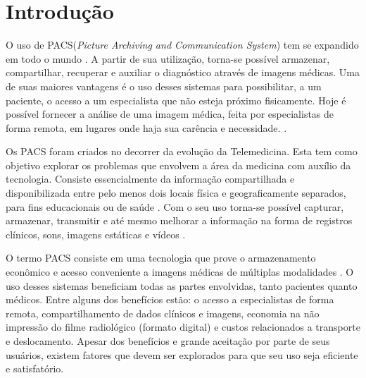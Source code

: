 \section{\esp Introdução}


O uso de PACS(\textit{Picture Archiving and Communication System}) tem se expandido em todo o mundo \cite{REF08}. A partir de sua utilização, torna-se possível armazenar, compartilhar, recuperar e auxiliar o diagnóstico através de imagens médicas. 
Uma de suas maiores vantagens é o uso desses sistemas para possibilitar, a um paciente, o acesso a um especialista que não esteja próximo fisicamente. 
Hoje é possível fornecer a análise de uma imagem médica, feita por especialistas de forma remota, em lugares onde haja sua carência e necessidade. \cite{REF01} \cite{REF04}.

Os PACS foram criados no decorrer da evolução da Telemedicina. 
Esta tem como objetivo explorar os problemas que envolvem a área da medicina com auxílio da tecnologia.
Consiste essencialmente da informação compartilhada e disponibilizada entre pelo menos dois locais física e geograficamente separados, para fins educacionais ou de saúde \cite{REF01}. 
Com o seu uso torna-se possível capturar, armazenar, transmitir e até mesmo melhorar a informação na forma de registros clínicos, sons, imagens estáticas e vídeos \cite{REF12}.

O termo PACS consiste em uma tecnologia que prove o armazenamento econômico e acesso conveniente a imagens médicas de múltiplas modalidades \cite{REF11}. O uso desses sistemas beneficiam todas as partes envolvidas, tanto pacientes quanto médicos.
Entre alguns dos benefícios estão: o acesso a especialistas de forma remota, compartilhamento de dados clínicos e imagens, economia na não impressão do filme radiológico (formato digital) e custos relacionados a transporte e deslocamento.
Apesar dos benefícios e grande aceitação por parte de seus usuários, existem fatores que devem ser explorados para que seu uso seja eficiente e satisfatório.

